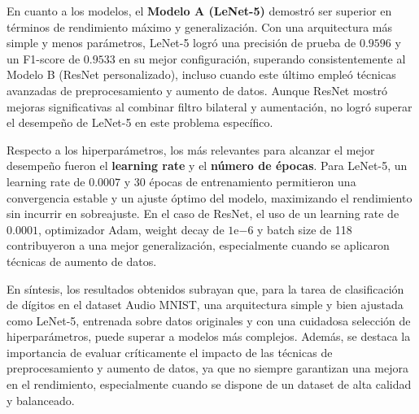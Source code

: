 \documentclass[conference]{IEEEtran}
\begin{document}
En cuanto a los modelos, el \textbf{Modelo A (LeNet-5)} demostró ser superior en términos de rendimiento máximo y generalización. Con una arquitectura más simple y menos parámetros, LeNet-5 logró una precisión de prueba de \(0.9596\) y un F1-score de \(0.9533\) en su mejor configuración, superando consistentemente al Modelo B (ResNet personalizado), incluso cuando este último empleó técnicas avanzadas de preprocesamiento y aumento de datos. Aunque ResNet mostró mejoras significativas al combinar filtro bilateral y aumentación, no logró superar el desempeño de LeNet-5 en este problema específico.

Respecto a los hiperparámetros, los más relevantes para alcanzar el mejor desempeño fueron el \textbf{learning rate} y el \textbf{número de épocas}. Para LeNet-5, un learning rate de \(0.0007\) y 30 épocas de entrenamiento permitieron una convergencia estable y un ajuste óptimo del modelo, maximizando el rendimiento sin incurrir en sobreajuste. En el caso de ResNet, el uso de un learning rate de \(0.0001\), optimizador Adam, weight decay de \(1\mathrm{e}{-6}\) y batch size de 118 contribuyeron a una mejor generalización, especialmente cuando se aplicaron técnicas de aumento de datos.

En síntesis, los resultados obtenidos subrayan que, para la tarea de clasificación de dígitos en el dataset Audio MNIST, una arquitectura simple y bien ajustada como LeNet-5, entrenada sobre datos originales y con una cuidadosa selección de hiperparámetros, puede superar a modelos más complejos. Además, se destaca la importancia de evaluar críticamente el impacto de las técnicas de preprocesamiento y aumento de datos, ya que no siempre garantizan una mejora en el rendimiento, especialmente cuando se dispone de un dataset de alta calidad y balanceado.
\end{document}
